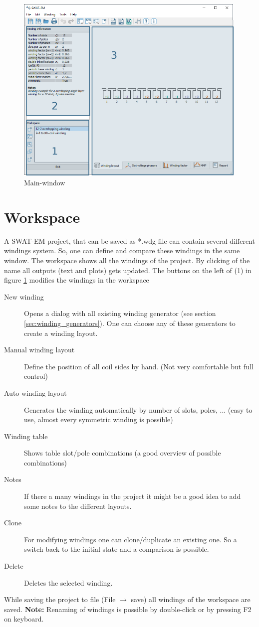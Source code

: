 \documentclass[]{scrreprt}
\begin{document}
%
\begin{figure}[htpb]
    \centering
    \includegraphics[width=0.99\textwidth,angle=0]{fig/mainwindow}
    \caption{Main-window}
    \label{fig:mainwindow}
\end{figure}
%
\section{Workspace}\label{sec:workspace}
A SWAT-EM project, that can be saved as *.wdg file can contain several different windings system.
So, one can define and compare these windings in the same window. The workspace shows all
the windings of the project. By clicking of the name all outputs (text and plots) gets updated.
The buttons on the left of (1) in figure \ref{fig:mainwindow} modifies the windings in the workspace
\begin{description}
 \item[New winding] Opens a dialog with all existing winding generator (see section \ref{sec:winding_generators}). 
		    One can choose any of these generators to create a winding layout.
 \item[Manual winding layout] Define the position of all coil sides by hand. (Not very comfortable
		    but full control)
 \item[Auto winding layout] Generates the winding automatically by number of slots, poles, ... (easy
                            to use, almost every symmetric winding is possible)
 \item[Winding table] Shows table slot/pole combinations (a good overview of possible combinations) 
 \item[Notes] If there a many windings in the project it might be a good idea to add some notes
              to the different layouts.
 \item[Clone] For modifying windings one can clone/duplicate an existing one. So a switch-back to the 
              initial state and a comparison is possible.
 \item[Delete] Deletes the selected winding.
\end{description}
%
While saving the project to file (File $\rightarrow$ save) all windings of the workspace are saved. 
\textbf{Note:} Renaming of windings is possible by double-click or by pressing F2 on keyboard.
%
%
\end{document}
